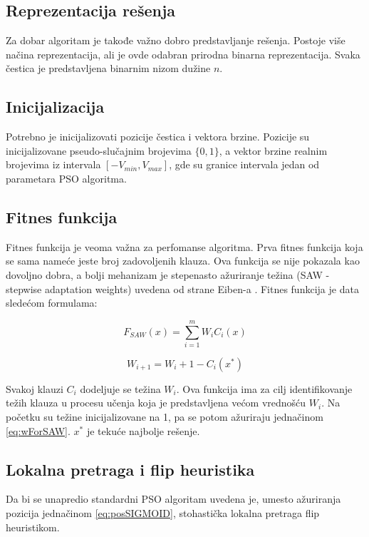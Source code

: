\documentclass{article}
\begin{document}
\subsection{Reprezentacija rešenja}
Za dobar algoritam je takođe važno dobro predstavljanje rešenja. Postoje više načina reprezentacija, ali je ovde odabran prirodna binarna reprezentacija. Svaka čestica je predstavljena binarnim nizom dužine $n$.


\subsection{Inicijalizacija}
Potrebno je inicijalizovati pozicije čestica i vektora brzine. Pozicije su inicijalizovane pseudo-slučajnim brojevima $\{0,1\}$, a vektor brzine realnim brojevima iz intervala $[-V_{min}, V_{max}]$, gde su granice intervala jedan od parametara PSO algoritma.


\subsection{Fitnes funkcija}
Fitnes funkcija je veoma važna za perfomanse algoritma.
Prva fitnes funkcija koja se sama nameće jeste broj zadovoljenih klauza. Ova funkcija se nije pokazala kao dovoljno dobra, a bolji mehanizam je stepenasto ažuriranje težina (SAW - stepwise adaptation weights) uvedena od strane Eiben-a \cite{fitnes}. Fitnes funkcija je data sledećom formulama:

\begin{equation}\label{eq:SAW}
F_{SAW}(x) = \sum_{i=1}^{m} W_iC_i(x)
\end{equation}

\begin{equation}\label{eq:wForSAW}
W_{i+1} = W_{i} + 1 - C_i(x^*)
\end{equation}

Svakoj klauzi $C_i$ dodeljuje se težina $W_i$. Ova funkcija ima za cilj identifikovanje težih klauza u procesu učenja koja je predstavljena većom vrednošću $W_i$. Na početku su težine inicijalizovane na 1, pa se potom ažuriraju jednačinom \ref{eq:wForSAW}. $x^*$ je tekuće najbolje rešenje.


\subsection{Lokalna pretraga i flip heuristika}
Da bi se unapredio standardni PSO algoritam uvedena je, umesto ažuriranja pozicija jednačinom \ref{eq:posSIGMOID}, stohastička lokalna pretraga flip heuristikom.\\
\end{document}
